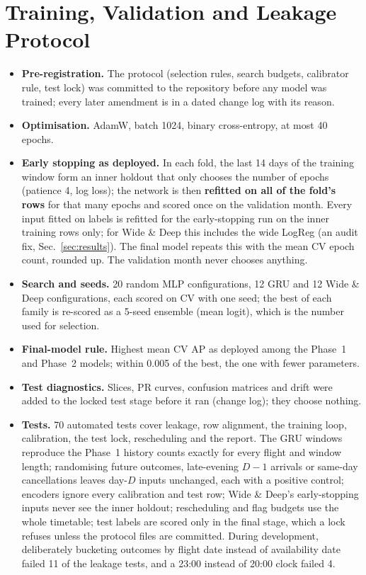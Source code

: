 \documentclass[conference]{IEEEtran}
\begin{document}
\section{Training, Validation and Leakage Protocol}\label{sec:protocol}
\begin{itemize}
\item \textbf{Pre-registration.} The protocol (selection rules, search budgets, calibrator rule, test lock) was committed to the repository before any model was trained; every later amendment is in a dated change log with its reason.
\item \textbf{Optimisation.} AdamW, batch 1024, binary cross-entropy, at most 40 epochs.
\item \textbf{Early stopping as deployed.} In each fold, the last 14 days of the training window form an inner holdout that only chooses the number of epochs (patience 4, log loss); the network is then \textbf{refitted on all of the fold's rows} for that many epochs and scored once on the validation month. Every input fitted on labels is refitted for the early-stopping run on the inner training rows only; for Wide \& Deep this includes the wide LogReg (an audit fix, Sec.~\ref{sec:results}). The final model repeats this with the mean CV epoch count, rounded up. The validation month never chooses anything.
\item \textbf{Search and seeds.} 20 random MLP configurations, 12 GRU and 12 Wide \& Deep configurations, each scored on CV with one seed; the best of each family is re-scored as a 5-seed ensemble (mean logit), which is the number used for selection.
\item \textbf{Final-model rule.} Highest mean CV AP as deployed among the Phase~1 and Phase~2 models; within 0.005 of the best, the one with fewer parameters.
\item \textbf{Test diagnostics.} Slices, PR curves, confusion matrices and drift were added to the locked test stage before it ran (change log); they choose nothing.
\item \textbf{Tests.} 70 automated tests cover leakage, row alignment, the training loop, calibration, the test lock, rescheduling and the report. The GRU windows reproduce the Phase~1 history counts exactly for every flight and window length; randomising future outcomes, late-evening $D-1$ arrivals or same-day cancellations leaves day-$D$ inputs unchanged, each with a positive control; encoders ignore every calibration and test row; Wide \& Deep's early-stopping inputs never see the inner holdout; rescheduling and flag budgets use the whole timetable; test labels are scored only in the final stage, which a lock refuses unless the protocol files are committed. During development, deliberately bucketing outcomes by flight date instead of availability date failed 11 of the leakage tests, and a 23:00 instead of 20:00 clock failed 4.
\end{itemize}
\end{document}
